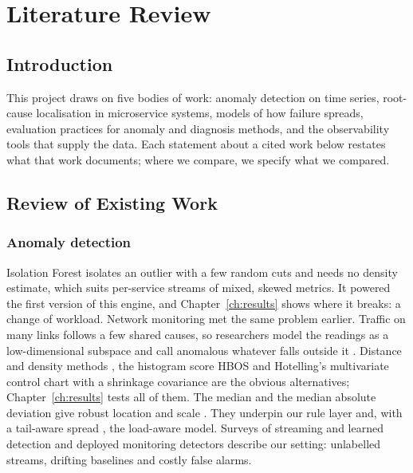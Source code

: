 \clearpage
\chapter[LITERATURE REVIEW]{Literature Review}
\label{ch:lit}

\section{Introduction}
This project draws on five bodies of work: anomaly detection on time series, root-cause localisation in microservice systems, models of how failure spreads, evaluation practices for anomaly and diagnosis methods, and the observability tools that supply the data. Each statement about a cited work below restates what that work documents; where we compare, we specify what we compared.

\section{Review of Existing Work}

\subsection{Anomaly detection}
Isolation Forest \cite{liu2008isolation,liu2012isolation} isolates an outlier with a few random cuts and needs no density estimate, which suits per-service streams of mixed, skewed metrics. It powered the first version of this engine, and Chapter~\ref{ch:results} shows where it breaks: a change of workload. Network monitoring met the same problem earlier. Traffic on many links follows a few shared causes, so researchers model the readings as a low-dimensional subspace and call anomalous whatever falls outside it \cite{lakhina2004diagnosing,jackson1979control}. Distance and density methods \cite{ramaswamy2000efficient,breunig2000lof}, the histogram score HBOS \cite{goldstein2012hbos} and Hotelling's multivariate control chart \cite{hotelling1931,mahalanobis1936} with a shrinkage covariance \cite{ledoit2004} are the obvious alternatives; Chapter~\ref{ch:results} tests all of them. The median and the median absolute deviation give robust location and scale \cite{hampel1974,rousseeuw1993}. They underpin our rule layer and, with a tail-aware spread \cite{rousseeuw1993alternatives}, the load-aware model. Surveys of streaming and learned detection \cite{gama2014survey,chandola2009survey,ahmad2017unsupervised} and deployed monitoring detectors \cite{laptev2015egads,su2019omnianomaly} describe our setting: unlabelled streams, drifting baselines and costly false alarms.

